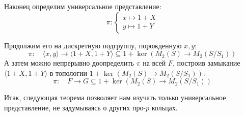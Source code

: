 \documentclass[12pt,a4paper]{article}
\begin{document}
    Наконец определим универсальное представление:
    \[
        \pi:
        \left\{
        \begin{array}{l}
            x \mapsto 1 + X \\
            y \mapsto 1 + Y
        \end{array}
        \right.
    \]

    Продолжим его на дискретную подгруппу, порожденную $x, y$:
    \[
        \pi: \quad \langle x, y \rangle \to \langle 1+X, 1+Y \rangle \subseteq 1 + \ker{(M_2(S) \to M_2(S / S_1))}
    \]
    А затем можно непрерывно доопределить $\pi$ на всей $F$, построив замыкание $\langle 1+X, 1+Y \rangle$ в топологии $1 + \ker{(M_2(S) \to M_2(S / S_1))}$:
    \[
        \pi:\quad F \to G \subseteq 1 + \ker{(M_2(S) \to M_2(S / S_1))}
    \]

    Итак, следующая теорема позволяет нам изучать только универсальное представление, не задумываясь о других про-$p$ кольцах.
\end{document}
